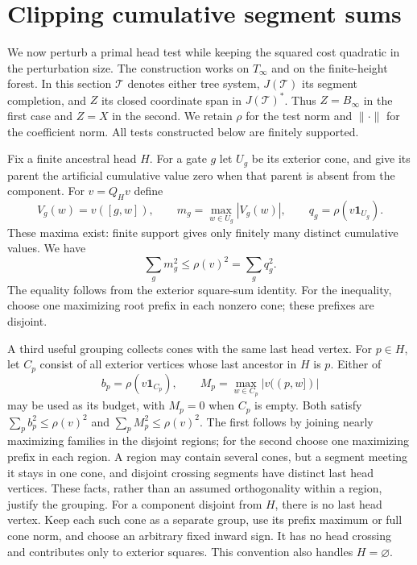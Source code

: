 \section{Clipping cumulative segment sums}\label{clip:section}

We now perturb a primal head test while keeping the squared cost
quadratic in the perturbation size. The construction works on
$T_\infty$ and on the finite-height forest. In this section $\mathcal T$
denotes either tree system, $J(\mathcal T)$ its segment completion,
and $Z$ its closed coordinate span in $J(\mathcal T)^*$. Thus
$Z=B_\infty$ in the first case and $Z=X$ in the second. We retain
$\rho$ for the test norm and $\|\cdot\|$ for the coefficient norm.
All tests constructed below are finitely supported.

Fix a finite ancestral head $H$. For a gate $g$ let $U_g$ be its
exterior cone, and give its parent the artificial cumulative value zero
when that parent is absent from the component. For $v=Q_Hv$ define
\[
 V_g(w)=v([g,w]),\qquad
 m_g=\max_{w\in U_g}|V_g(w)|,\qquad
 q_g=\rho(v\mathbf1_{U_g}).
\]
These maxima exist: finite support gives only finitely many distinct
cumulative values. We have
\begin{equation}\label{clip:budgets}
 \sum_gm_g^2\le\rho(v)^2=\sum_gq_g^2.
\end{equation}
The equality follows from the exterior square-sum identity. For the
inequality, choose one maximizing root prefix in each nonzero cone;
these prefixes are disjoint.

A third useful grouping collects cones with the same last head vertex.
For $p\in H$, let $C_p$ consist of all exterior vertices whose last
ancestor in $H$ is $p$. Either of
\begin{equation}\label{clip:group-budgets}
 b_p=\rho(v\mathbf1_{C_p}),\qquad
 M_p=\max_{w\in C_p}|v((p,w])|
\end{equation}
may be used as its budget, with $M_p=0$ when $C_p$ is empty. Both satisfy
$\sum_pb_p^2\le\rho(v)^2$ and $\sum_pM_p^2\le\rho(v)^2$.
The first follows by joining nearly maximizing families in the disjoint
regions; for the second choose one maximizing prefix in each region.
A region may contain several cones, but a segment meeting it stays
in one cone, and disjoint crossing segments have distinct last head
vertices. These facts, rather than an assumed orthogonality within a
region, justify the grouping. For a component disjoint from $H$, there is no
last head vertex. Keep each such cone as a separate group, use its
prefix maximum or full cone norm, and choose an arbitrary fixed
inward sign. It has no head crossing and contributes only to exterior
squares. This convention also handles $H=\varnothing$.

